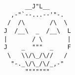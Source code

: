 \documentclass{article}
\begin{document}
\textbf{\\\\\\\\\\\\\\\\\\\\\\\\\\\\\\\\\\\\\\\\\\\\\\\\\\\\\\}
\begin{verbatim}
                                          __J"L__
                                      ,-"`--...--'"-.
                                     /  /\       /\  \
                                    J  /__\  _  /__\  L
                                    |       / \       |
                                    J    _  """  _    F
                                     \   \\/\_/\//   /
                                      "-._\/\_/\/_,-"
                                          """""""
\end{verbatim}
\end{document}
